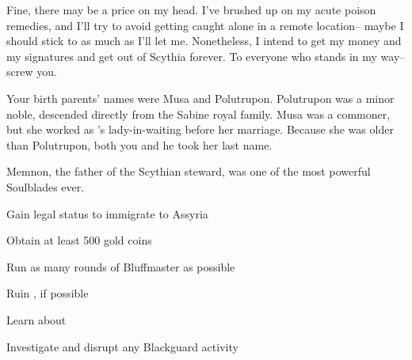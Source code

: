 \documentclass[char]{Kos}
\begin{document}
Fine, there may be a price on my head. I've brushed up on my acute poison remedies, and I'll try to avoid getting caught alone in a remote location-- maybe I should stick to \cPoet{} as much as \cPoet{\they}I'll let me. Nonetheless, I intend to get my money and my signatures and get out of Scythia forever. To everyone who stands in my way-- screw you.

\begin{itemz}[Notes]
  \item Your birth parents' names were Musa and Polutrupon. Polutrupon was a minor noble, descended directly from the Sabine royal family. Musa was a commoner, but she worked as \cScythiaQueen{}'s lady-in-waiting before her marriage. Because she was older than Polutrupon, both you and he took her last name.
  \item Memnon, the father of the Scythian steward, was one of the most powerful Soulblades ever.
\end{itemz}

\begin{itemz}[Goals]
\item Gain legal status to immigrate to Assyria
\item Obtain at least 500 gold coins
\item Run as many rounds of Bluffmaster as possible
\item Ruin \cBride{}, if possible
\item Learn about \cAnarchist{}
\item Investigate and disrupt any Blackguard activity
\end{itemz}
\end{document}
